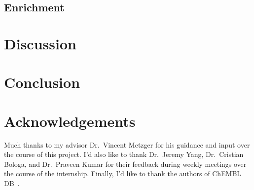 \documentclass[11pt]{article}
\begin{document}
\subsection{Enrichment}\label{subsec:results_enrichment}

\section{Discussion}\label{sec:discussion}
\section{Conclusion}


\section{Acknowledgements}
Much thanks to my advisor Dr.~Vincent Metzger for his guidance and input over the course of this project. I'd also like to thank Dr.~Jeremy Yang, Dr.~Cristian Bologa, and Dr.~Praveen Kumar for their feedback during weekly meetings over the course of the internship. Finally, I'd like to thank the   authors of ChEMBL DB~\cite{chembl_db_2023}.


\end{document}
